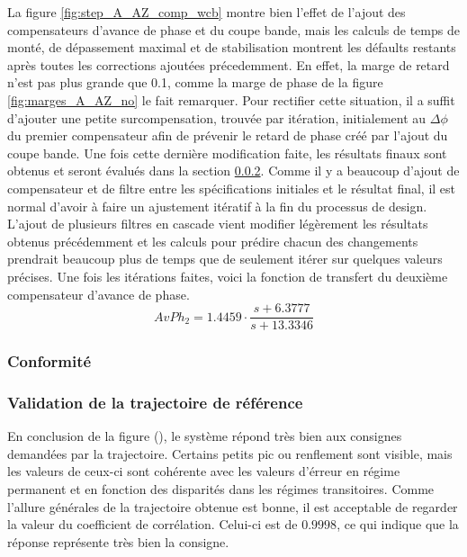 \documentclass{udes_rapport} %
\begin{document}
La figure \ref{fig:step_A_AZ_comp_wcb} montre bien l'effet de l'ajout des compensateurs d'avance de phase et du coupe bande, mais les calculs de temps de monté, de dépassement maximal et de stabilisation montrent les défaults restants après toutes les corrections ajoutées précedemment. En effet, la marge de retard n'est pas plus grande que 0.1, comme la marge de phase de la figure \ref{fig:marges_A_AZ_no} le fait remarquer. Pour rectifier cette situation, il a suffit d'ajouter une petite surcompensation, trouvée par itération, initialement au $\Delta \phi$ du premier compensateur afin de prévenir le retard de phase créé par l'ajout du coupe bande. Une fois cette dernière modification faite, les résultats finaux sont obtenus et seront évalués dans la section \ref{valid_AZ_A}. Comme il y a beaucoup d'ajout de compensateur et de filtre entre les spécifications initiales et le résultat final, il est normal d'avoir à faire un ajustement itératif à la fin du processus de design. L'ajout de plusieurs filtres en cascade vient modifier légèrement les résultats obtenus précédemment et les calculs pour prédire chacun des changements prendrait beaucoup plus de temps que de seulement itérer sur quelques valeurs précises. Une fois les itérations faites, voici la fonction de transfert du deuxième compensateur d'avance de phase.
\[ AvPh_2 =  1.4459 \cdot \frac{s+6.3777}{s+13.3346}\]

\subsubsection{Conformité}
\subsubsection{Validation de la trajectoire de référence} \label{valid_AZ_A}
En conclusion de la figure (), le système répond très bien aux consignes demandées par la trajectoire. Certains petits pic ou renflement sont visible, mais les valeurs de ceux-ci sont cohérente avec les valeurs d'érreur en régime permanent et en fonction des disparités dans les régimes transitoires. Comme l'allure générales de la trajectoire obtenue est bonne, il est acceptable de regarder la valeur du coefficient de corrélation. Celui-ci est de $0.9998$, ce qui indique que la réponse représente très bien la consigne.
\end{document}
